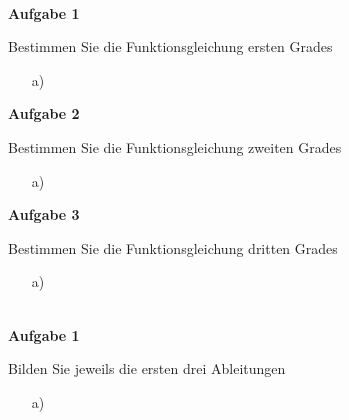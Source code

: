 \documentclass[12pt, a4paper]{scrartcl}
\begin{document}
	\newcommand{\Thema}{Modellierung von Funktionen}
	\Abschnitt
	\ \\[-1cm]
	\textbf{Aufgabe 1}
	
	Bestimmen Sie die Funktionsgleichung ersten Grades
	\begin{itemize}
		\item[a)]
	\end{itemize}
	\textbf{Aufgabe 2}

	Bestimmen Sie die Funktionsgleichung zweiten Grades
	\begin{itemize}
		\item[a)]
	\end{itemize}
	\textbf{Aufgabe 3}
	
	Bestimmen Sie die Funktionsgleichung dritten Grades
	\begin{itemize}
		\item[a)]
	\end{itemize}

	\renewcommand{\Thema}{Ableitungen}
	\Abschnitt
	\ \\[-1cm]
	\textbf{Aufgabe 1}
	
	Bilden Sie jeweils die ersten drei Ableitungen
	\begin{itemize}
		\item[a)]
	\end{itemize}
	
\end{document}
